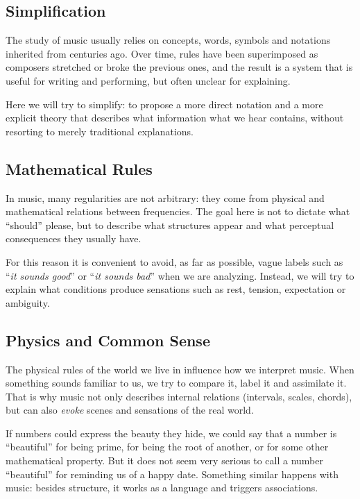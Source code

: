 \documentclass[]{report}
\begin{document}
\subsection{Simplification}

The study of music usually relies on concepts, words, symbols and notations inherited from centuries ago. Over time, rules have been superimposed as composers stretched or broke the previous ones, and the result is a system that is useful for writing and performing, but often unclear for explaining.

Here we will try to simplify: to propose a more direct notation and a more explicit theory that describes what information what we hear contains, without resorting to merely traditional explanations.

\subsection{Mathematical Rules}

In music, many regularities are not arbitrary: they come from physical and mathematical relations between frequencies. The goal here is not to dictate what ``should'' please, but to describe what structures appear and what perceptual consequences they usually have.

For this reason it is convenient to avoid, as far as possible, vague labels such as ``\emph{it sounds good}'' or ``\emph{it sounds bad}'' when we are analyzing. Instead, we will try to explain what conditions produce sensations such as rest, tension, expectation or ambiguity.

\subsection{Physics and Common Sense}

The physical rules of the world we live in influence how we interpret music. When something sounds familiar to us, we try to compare it, label it and assimilate it. That is why music not only describes internal relations (intervals, scales, chords), but can also \emph{evoke} scenes and sensations of the real world.

If numbers could express the beauty they hide, we could say that a number is ``beautiful'' for being prime, for being the root of another, or for some other mathematical property. But it does not seem very serious to call a number ``beautiful'' for reminding us of a happy date. Something similar happens with music: besides structure, it works as a language and triggers associations.
\end{document}
